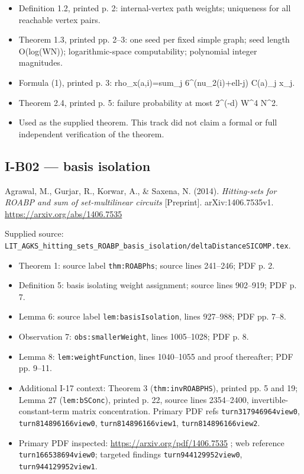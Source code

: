 \documentclass[11pt,a4paper]{article}
\providecommand{\tightlist}{\setlength{\itemsep}{0pt}\setlength{\parskip}{0pt}}
\theoremstyle{definition}\newtheorem{definition}{Definition}
\begin{document}
\begin{itemize}
\tightlist
\item
  Definition 1.2, printed p. 2: internal-vertex path weights; uniqueness
  for all reachable vertex pairs.
\item
  Theorem 1.3, printed pp. 2--3: one seed per fixed simple graph; seed
  length O(log(WN)); logarithmic-space computability; polynomial integer
  magnitudes.
\item
  Formula (1), printed p. 3: rho\_x(a,i)=sum\_j 6\^{}(nu\_2(i)+ell-j)
  C(a)\_j x\_j.
\item
  Theorem 2.4, printed p. 5: failure probability at most 2\^{}(-d)
  W\^{}4 N\^{}2.
\item
  Used as the supplied theorem. This track did not claim a formal or
  full independent verification of the theorem.
\end{itemize}

\subsection{I-B02 --- basis isolation}\label{i-b02--basis-isolation}

Agrawal, M., Gurjar, R., Korwar, A., \& Saxena, N. (2014).
\emph{Hitting-sets for ROABP and sum of set-multilinear circuits}
{[}Preprint{]}. arXiv:1406.7535v1. \url{https://arxiv.org/abs/1406.7535}

Supplied source:
\texttt{LIT\_AGKS\_hitting\_sets\_ROABP\_basis\_isolation/deltaDistanceSICOMP.tex}.

\begin{itemize}
\tightlist
\item
  Theorem 1: source label \texttt{thm:ROABPhs}; source lines 241--246;
  PDF p. 2.
\item
  Definition 5: basis isolating weight assignment; source lines
  902--919; PDF p. 7.
\item
  Lemma 6: source label \texttt{lem:basisIsolation}, lines 927--988; PDF
  pp. 7--8.
\item
  Observation 7: \texttt{obs:smallerWeight}, lines 1005--1028; PDF p. 8.
\item
  Lemma 8: \texttt{lem:weightFunction}, lines 1040--1055 and proof
  thereafter; PDF pp. 9--11.
\item
  Additional I-17 context: Theorem 3 (\texttt{thm:invROABPHS}), printed
  pp. 5 and 19; Lemma 27 (\texttt{lem:bSConc}), printed p. 22, source
  lines 2354--2400, invertible-constant-term matrix concentration.
  Primary PDF refs \texttt{turn317946964view0},
  \texttt{turn814896166view0}, \texttt{turn814896166view1},
  \texttt{turn814896166view2}.
\item
  Primary PDF inspected: \url{https://arxiv.org/pdf/1406.7535} ; web
  reference \texttt{turn166538694view0}; targeted findings
  \texttt{turn944129952view0}, \texttt{turn944129952view1}.
\end{itemize}
\end{document}
